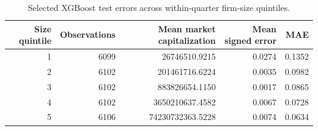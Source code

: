 \begin{table}
\caption{Selected XGBoost test errors across within-quarter firm-size quintiles.}
\label{tab:xgboost-test-errors-by-size}
\begin{tabular}{rrrrr}
\toprule
Size quintile & Observations & Mean market capitalization & Mean signed error & MAE \\
\midrule
1 & 6099 & 26746510.9215 & 0.0274 & 0.1352 \\
2 & 6102 & 201461716.6224 & 0.0035 & 0.0982 \\
3 & 6102 & 883826654.1150 & 0.0017 & 0.0865 \\
4 & 6102 & 3650210637.4582 & 0.0067 & 0.0728 \\
5 & 6106 & 74230732363.5228 & 0.0074 & 0.0634 \\
\bottomrule
\end{tabular}
\end{table}
